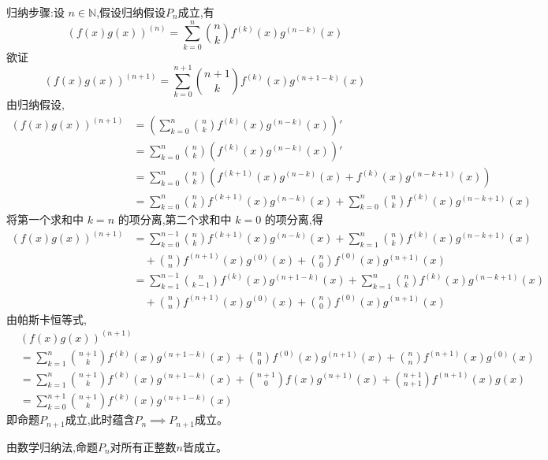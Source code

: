 \begin{questions}
\begin{solution}
        归纳步骤:设 $n \in \mathbb{N}$,假设归纳假设$P_n$成立,有
        \[
        (f(x)g(x))^{(n)} = \sum_{k=0}^{n} \binom{n}{k} f^{(k)}(x) g^{(n-k)}(x)
        \]
        欲证
        \[
        (f(x)g(x))^{(n+1)} = \sum_{k=0}^{n+1} \binom{n+1}{k} f^{(k)}(x) g^{(n+1-k)}(x)
        \]
        由归纳假设,
        \begin{align}
        (f(x)g(x))^{(n+1)}
        &= \left( \sum_{k=0}^{n} \binom{n}{k} f^{(k)}(x) g^{(n-k)}(x) \right)' \\
        &= \sum_{k=0}^{n} \binom{n}{k} \left(f^{(k)}(x) g^{(n-k)}(x) \right)' \\
        &= \sum_{k=0}^{n} \binom{n}{k} \left( f^{(k+1)}(x) g^{(n-k)}(x) + f^{(k)}(x) g^{(n-k+1)}(x) \right) \\
        &= \sum_{k=0}^{n} \binom{n}{k} f^{(k+1)}(x) g^{(n-k)}(x)
        + \sum_{k=0}^{n} \binom{n}{k} f^{(k)}(x) g^{(n-k+1)}(x)
        \end{align}
        将第一个求和中 $k=n$ 的项分离,第二个求和中 $k=0$ 的项分离,得
        \begin{align}
        (f(x)g(x))^{(n+1)} 
        &= \sum_{k=0}^{n-1} \binom{n}{k} f^{(k+1)}(x) g^{(n-k)}(x)
        + \sum_{k=1}^{n} \binom{n}{k} f^{(k)}(x) g^{(n-k+1)}(x) \\
        &\quad + \binom{n}{n} f^{(n+1)}(x) g^{(0)}(x)
        + \binom{n}{0} f^{(0)}(x) g^{(n+1)}(x) \\
        &= \sum_{k=1}^{n-1} \binom{n}{k-1} f^{(k)}(x) g^{(n+1-k)}(x)
        + \sum_{k=1}^{n} \binom{n}{k} f^{(k)}(x) g^{(n-k+1)}(x) \\
        &\quad + \binom{n}{n} f^{(n+1)}(x) g^{(0)}(x)
        + \binom{n}{0} f^{(0)}(x) g^{(n+1)}(x)
        \end{align}
        由帕斯卡恒等式,
        \begin{align}
        &(f(x) g(x))^{(n+1)} \\
        &= \sum_{k=1}^{n} \binom{n+1}{k} f^{(k)}(x) g^{(n+1-k)}(x) + \binom{n}{0} f^{(0)}(x) g^{(n+1)}(x) + \binom{n}{n} f^{(n+1)}(x) g^{(0)}(x) \\
        &= \sum_{k=1}^{n} \binom{n+1}{k} f^{(k)}(x) g^{(n+1-k)}(x) + \binom{n+1}{0} f(x) g^{(n+1)}(x) + \binom{n+1}{n+1} f^{(n+1)}(x) g(x) \\
        &= \sum_{k=0}^{n+1} \binom{n+1}{k} f^{(k)}(x) g^{(n+1-k)}(x)
        \end{align}
        即命题$P_{n+1}$成立,此时蕴含$P_n \implies P_{n+1}$成立。
        
        由数学归纳法,命题$P_n$对所有正整数$n$皆成立。
    \end{solution}


\end{questions}
